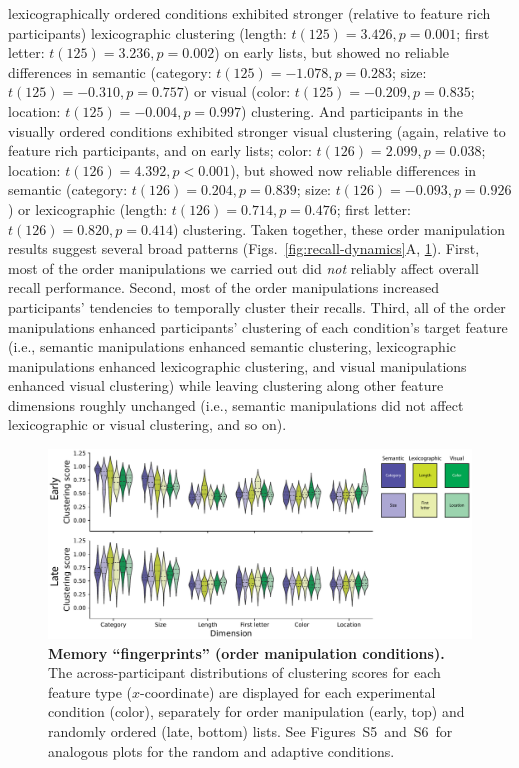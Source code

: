 \documentclass[11pt]{article}
\newcommand{\fingerprintsRandom}{S5}
\newcommand{\fingerprintsAdaptive}{S6}
\begin{document}
lexicographically ordered conditions exhibited stronger (relative to feature
rich participants) lexicographic clustering (length: $t(125) = 3.426, p =
0.001$; first letter: $t(125) = 3.236, p = 0.002$) on early lists, but showed
no reliable differences in semantic (category: $t(125) = -1.078, p = 0.283$;
size: $t(125) = -0.310, p = 0.757$) or visual (color: $t(125) = -0.209, p =
0.835$; location: $t(125) = -0.004, p = 0.997$) clustering. And participants in
the visually ordered conditions exhibited stronger visual clustering (again,
relative to feature rich participants, and on early lists; color: $t(126) =
2.099, p = 0.038$; location: $t(126) = 4.392, p < 0.001$), but showed now
reliable differences in semantic (category: $t(126) = 0.204, p = 0.839$; size:
$t(126) = -0.093, p = 0.926$) or lexicographic (length: $t(126) = 0.714, p =
0.476$; first letter: $t(126) = 0.820, p = 0.414$) clustering. Taken together,
these order manipulation results suggest several broad patterns
(Figs.~\ref{fig:recall-dynamics}A, \ref{fig:fingerprints}). First, most of the
order manipulations we carried out did \textit{not} reliably affect overall
recall performance. Second, most of the order manipulations increased
participants' tendencies to temporally cluster their recalls. Third, all of the
order manipulations enhanced participants' clustering of each condition's
target feature (i.e., semantic manipulations enhanced semantic clustering,
lexicographic manipulations enhanced lexicographic clustering, and visual
manipulations enhanced visual clustering) while leaving clustering along other
feature dimensions roughly unchanged (i.e., semantic manipulations did not
affect lexicographic or visual clustering, and so on).

\begin{figure}[tp] \centering
    \includegraphics[width=\textwidth]{figures/fingerprints}
    
\caption{\textbf{Memory ``fingerprints'' (order manipulation conditions).} The
across-participant distributions of clustering scores for each feature type
($x$-coordinate) are displayed for each experimental condition (color),
separately for order manipulation (early, top) and randomly ordered (late,
bottom) lists. See Figures~\fingerprintsRandom~and~\fingerprintsAdaptive~for
analogous plots for the random and adaptive conditions.}
\label{fig:fingerprints}

\end{figure}
\end{document}
